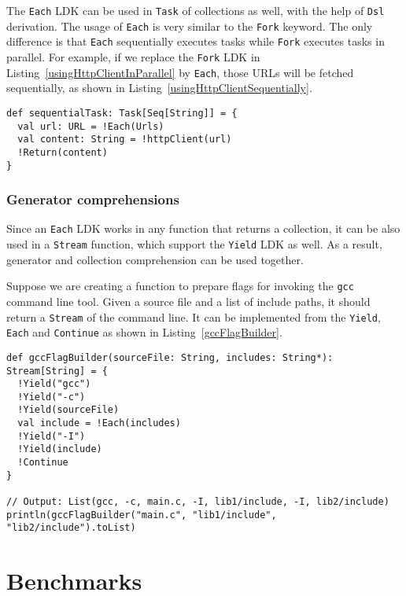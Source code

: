The \lstinline{Each} LDK can be used in \lstinline{Task} of collections as well, with the help of \lstinline{Dsl} derivation. The usage of \lstinline{Each} is very similar to the \lstinline{Fork} keyword. The only difference is that \lstinline{Each} sequentially executes tasks while \lstinline{Fork} executes tasks in parallel. For example, if we replace the \lstinline{Fork} LDK in Listing~\ref{usingHttpClientInParallel} by \lstinline{Each}, those URLs will be fetched sequentially, as shown in Listing~\ref{usingHttpClientSequentially}.

\begin{lstlisting}[caption={Using HTTP client in parallel},label={usingHttpClientSequentially}]
def sequentialTask: Task[Seq[String]] = {
  val url: URL = !Each(Urls)
  val content: String = !httpClient(url)
  !Return(content)
}
\end{lstlisting}

\subsubsection{Generator comprehensions}\label{Generator comprehensions}

Since an \lstinline{Each} LDK works in any function that returns a collection, it can be also used in a \lstinline{Stream} function, which support the \lstinline{Yield} LDK as well. As a result, generator and collection comprehension can be used together.

Suppose we are creating a function to prepare flags for invoking the \texttt{gcc} command line tool. Given a source file and a list of include paths, it should return a \lstinline{Stream} of the command line.
It can be implemented from the \lstinline{Yield}, \lstinline{Each} and \lstinline{Continue} as shown in Listing~\ref{gccFlagBuilder}.

\begin{lstlisting}[caption={Build a command-line by using generator and collection comprehension together},label={gccFlagBuilder}]
def gccFlagBuilder(sourceFile: String, includes: String*): Stream[String] = {
  !Yield("gcc")
  !Yield("-c")
  !Yield(sourceFile)
  val include = !Each(includes)
  !Yield("-I")
  !Yield(include)
  !Continue
}

// Output: List(gcc, -c, main.c, -I, lib1/include, -I, lib2/include)
println(gccFlagBuilder("main.c", "lib1/include", "lib2/include").toList)
\end{lstlisting}

\section{Benchmarks}\label{Benchmarks}

